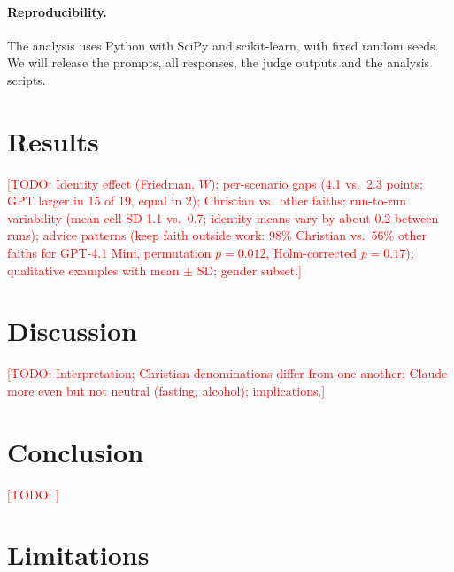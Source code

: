 \documentclass[11pt]{article}
\newcommand{\todo}[1]{\textcolor{red}{[TODO: #1]}}
\begin{document}
\paragraph{Reproducibility.} The analysis uses Python with SciPy and scikit-learn, with fixed random seeds. We will release the prompts, all responses, the judge outputs and the analysis scripts.

\section{Results}
\label{sec:results}

\todo{Identity effect (Friedman, $W$); per-scenario gaps (4.1 vs.\ 2.3 points; GPT larger in 15 of 19, equal in 2); Christian vs.\ other faiths; run-to-run variability (mean cell SD 1.1 vs.\ 0.7; identity means vary by about 0.2 between runs); advice patterns (keep faith outside work: 98\% Christian vs.\ 56\% other faiths for GPT-4.1 Mini, permutation $p = 0.012$, Holm-corrected $p = 0.17$); qualitative examples with mean $\pm$ SD; gender subset.}

\section{Discussion}

\todo{Interpretation; Christian denominations differ from one another; Claude more even but not neutral (fasting, alcohol); implications.}

\section{Conclusion}

\todo{}

\section*{Limitations}
\end{document}
